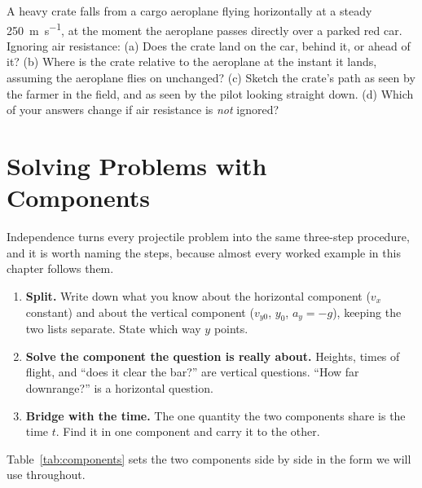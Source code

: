 \documentclass[11pt,twoside,openany]{book}
\newcounter{check}[chapter]
\begin{document}
\begin{checkbox}
A heavy crate falls from a cargo aeroplane flying horizontally at a steady \SI{250}{\metre\per\second}, at the moment the aeroplane passes directly over a parked red car. Ignoring air resistance: (a) Does the crate land on the car, behind it, or ahead of it? (b) Where is the crate relative to the aeroplane at the instant it lands, assuming the aeroplane flies on unchanged? (c) Sketch the crate's path as seen by the farmer in the field, and as seen by the pilot looking straight down. (d) Which of your answers change if air resistance is \emph{not} ignored?
\end{checkbox}

\section{Solving Problems with Components}
\label{sec:solving}

Independence turns every projectile problem into the same three-step procedure, and it is worth naming the steps, because almost every worked example in this chapter follows them.

\begin{keyidea}
\begin{enumerate}[itemsep=1pt,topsep=2pt]
  \item \textbf{Split.} Write down what you know about the horizontal component ($v_x$ constant) and about the vertical component ($v_{y0}$, $y_0$, $a_y = -g$), keeping the two lists separate. State which way $y$ points.
  \item \textbf{Solve the component the question is really about.} Heights, times of flight, and ``does it clear the bar?'' are vertical questions. ``How far downrange?'' is a horizontal question.
  \item \textbf{Bridge with the time.} The one quantity the two components share is the time $t$. Find it in one component and carry it to the other.
\end{enumerate}
\end{keyidea}

Table~\ref{tab:components} sets the two components side by side in the form we will use throughout.
\end{document}
